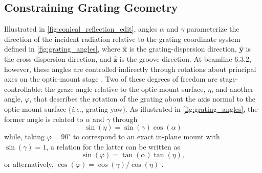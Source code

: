 \subsection{Constraining Grating Geometry}\label{sec:geo_constrain}
Illustrated in \cref{fig:conical_reflection_edit}, angles $\alpha$ and $\gamma$ parameterize the direction of the incident radiation relative to the grating coordinate system defined in \cref{fig:grating_angles}, where $\mathbold{\hat{x}}$ is the grating-dispersion direction, $\mathbold{\hat{y}}$ is the cross-dispersion direction, and $\mathbold{\hat{z}}$ is the groove direction. 
At beamline 6.3.2, however, these angles are controlled indirectly through rotations about principal axes on the optic-mount stage \cite{Gullikson01,Miles18}. 
Two of these degrees of freedom are stage-controllable: the graze angle relative to the optic-mount surface, $\eta$, and another angle, $\varphi$, that describes the rotation of the grating about the axis normal to the optic-mount surface (\emph{i.e.}, grating yaw). 
As illustrated in \cref{fig:grating_angles}, the former angle is related to $\alpha$ and $\gamma$ through
\begin{equation}\label{eq:graze_angle}
 \sin \left( \eta \right) = \sin \left( \gamma \right) \cos \left( \alpha \right)
 \end{equation}
while, taking $\varphi = 90^{\circ}$ to correspond to an exact in-plane mount with $\sin \left( \gamma \right) = 1$, a relation for the latter can be written as 
\begin{equation}\label{eq:yaw_angle}
 \sin \left( \varphi \right) = \tan \left( \alpha \right) \tan \left( \eta \right) ,
 \end{equation}
or alternatively, $\cos \left( \varphi \right) = \cos \left( \gamma \right) / \cos \left( \eta \right)$ \cite{Miles18}.

